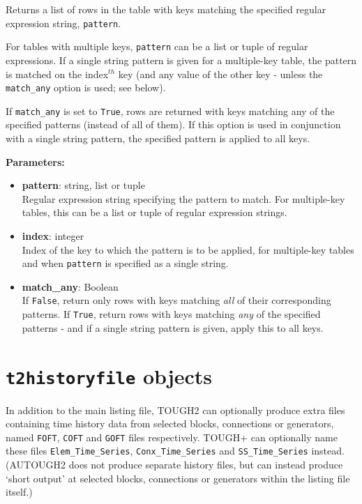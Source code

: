 Returns a list of rows in the table with keys matching the specified regular expression string, \texttt{pattern}.

For tables with multiple keys, \texttt{pattern} can be a list or tuple of regular expressions.  If a single string pattern is given for a multiple-key table, the pattern is matched on the index$^{th}$ key (and any value of the other key - unless the \texttt{match\_any} option is used; see below).

If \texttt{match\_any} is set to \texttt{True}, rows are returned with keys matching any of the specified patterns (instead of all of them).  If this option is used in conjunction with a single string pattern, the specified pattern is applied to all keys.

\textbf{Parameters:}
\begin{itemize}
\item \textbf{pattern}: string, list or tuple\\
  Regular expression string specifying the pattern to match.  For multiple-key tables, this can be a list or tuple of regular expression strings.
\item \textbf{index}: integer\\
  Index of the key to which the pattern is to be applied, for multiple-key tables and when \texttt{pattern} is specified as a single string.
\item \textbf{match\_any}: Boolean\\
  If \texttt{False}, return only rows with keys matching \emph{all} of their corresponding patterns.  If \texttt{True}, return rows with keys matching \emph{any} of the specified patterns - and if a single string pattern is given, apply this to all keys.
\end{itemize}

\section{\texttt{t2historyfile} objects}

In addition to the main listing file, TOUGH2 can optionally produce extra files containing time history data from selected blocks, connections or generators, named \texttt{FOFT}, \texttt{COFT} and \texttt{GOFT} files respectively.  TOUGH+ can optionally name these files \texttt{Elem\_Time\_Series}, \texttt{Conx\_Time\_Series} and \texttt{SS\_Time\_Series} instead.  (AUTOUGH2 does not produce separate history files, but can instead produce `short output' at selected blocks, connections or generators within the listing file itself.)

